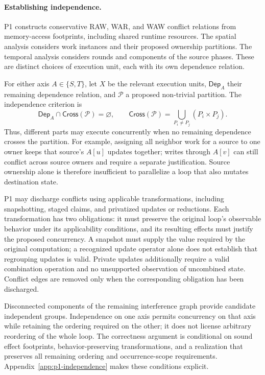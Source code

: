 \paragraph{Establishing independence.}
P1 constructs conservative RAW, WAR, and WAW conflict relations from
memory-access footprints, including shared runtime resources. The
spatial analysis considers work instances and their proposed ownership
partitions. The temporal analysis considers rounds and components of
the source phases. These are distinct choices of execution unit, each
with its own dependence relation.

For either axis $A\in\{S,T\}$, let $X$ be the relevant execution units,
$\mathsf{Dep}_A$ their remaining dependence relation, and $\mathcal P$ a
proposed non-trivial partition. The independence criterion is
\begin{equation}
\mathsf{Dep}_A\cap\mathsf{Cross}(\mathcal P)=\varnothing,
\qquad
\mathsf{Cross}(\mathcal P)=
\bigcup_{P_i\ne P_j}(P_i\times P_j).
\label{eq:p1-independence}
\end{equation}
Thus, different parts may execute concurrently when no remaining
dependence crosses the partition. For example, assigning all neighbor
work for a source to one owner keeps that source's $A[u]$ updates
together; writes through $A[v]$ can still conflict across source owners
and require a separate justification. Source ownership alone is therefore
insufficient to parallelize a loop that also mutates destination state.

P1 may discharge conflicts using applicable transformations, including
snapshotting, staged claims, and privatized updates or reductions.
Each transformation has two obligations: it must preserve the original
loop's observable behavior under its applicability conditions, and its
resulting effects must justify the proposed concurrency. A snapshot must
supply the value required by the original computation; a recognized
update operator alone does not establish that regrouping updates is
valid. Private updates additionally require a valid combination operation
and no unsupported observation of uncombined state. Conflict edges are
removed only when the corresponding obligation has been discharged.

Disconnected components of the remaining interference graph provide
candidate independent groups. Independence on one axis permits concurrency
on that axis while retaining the ordering required on the other; it does
not license arbitrary reordering of the whole loop. The correctness
argument is conditional on sound effect footprints, behavior-preserving
transformations, and a realization that preserves all remaining ordering
and occurrence-scope requirements. Appendix~\ref{app:p1-independence}
makes these conditions explicit.

